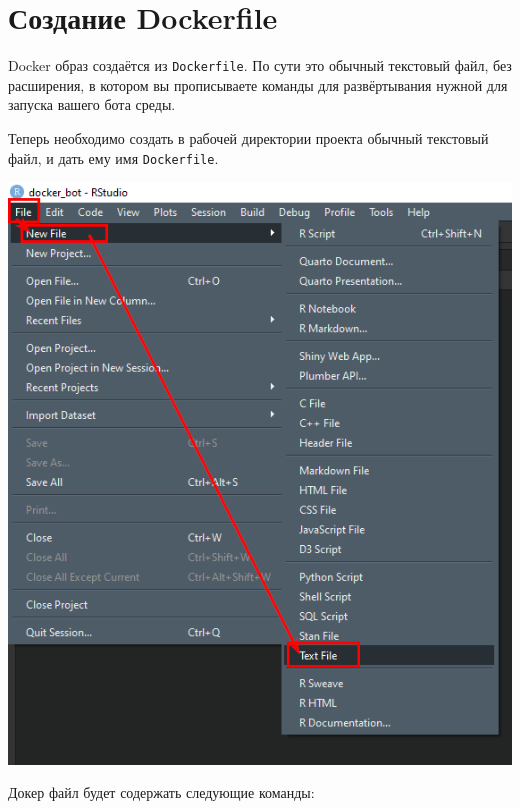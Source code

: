 \documentclass[
]{book}
\begin{document}
\section{Создание Dockerfile}\label{ux441ux43eux437ux434ux430ux43dux438ux435-dockerfile}

Docker образ создаётся из \texttt{Dockerfile}. По сути это обычный текстовый файл, без расширения, в котором вы прописываете команды для развёртывания нужной для запуска вашего бота среды.

Теперь необходимо создать в рабочей директории проекта обычный текстовый файл, и дать ему имя \texttt{Dockerfile}.

\includegraphics{img/8-4.png}

Докер файл будет содержать следующие команды:
\end{document}
